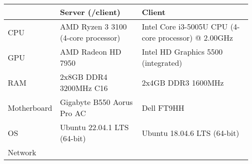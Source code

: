 \begin{tabular}{lll}
\hline
            & Server (/client)                    & Client                                               \\ \hline
CPU         & AMD Ryzen 3 3100 (4-core processor) & Intel Core i3-5005U CPU (4-core processor) @ 2.00GHz \\ \hline
GPU         & AMD Radeon HD 7950                  & Intel HD Graphics 5500 (integrated)                  \\ \hline
RAM         & 2x8GB DDR4 3200MHz C16              & 2x4GB DDR3 1600MHz                                   \\ \hline
Motherboard & Gigabyte B550 Aorus Pro AC          & Dell FT9HH                                           \\ \hline
OS          & Ubuntu 22.04.1 LTS (64-bit)         & Ubuntu 18.04.6 LTS (64-bit)                          \\ \hline
Network     &                                     &                                                      \\ \hline
\end{tabular}
